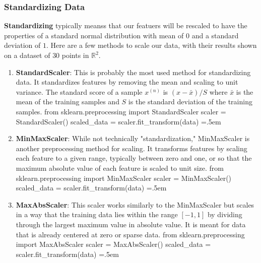 \documentclass{article}
\theoremstyle{definition}
\newenvironment{cverbatim}
    {\SaveVerbatim{cverb}}
    {\endSaveVerbatim
    \flushleft\fboxrule=0pt\fboxsep=.5em
    \colorbox{cverbbg}{%
      \makebox[\dimexpr\linewidth-2\fboxsep][l]{\BUseVerbatim{cverb}}%
    }
    \endflushleft
  }
\begin{document}
    \subsubsection{Standardizing Data}

    \textbf{Standardizing} typically meanss that our featuers will be rescaled to have the properties of a standard normal distribution with mean of $0$ and a standard deviation of $1$. Here are a few methods to scale our data, with their results shown on a dataset of $30$ points in $\mathbb{R}^2$. 
    \begin{enumerate}
        \item \textbf{StandardScaler}: This is probably the most used method for standardizing data. It standardizes features by removing the mean and scaling to unit variance. The standard score of a sample $x^{(n)}$ is $(x - \bar{x})/S$ where $\bar{x}$ is the mean of the training samples and $S$ is the standard deviation of the training samples. 
        \begin{cverbatim}
        from sklearn.preprocessing import StandardScaler
        scaler = StandardScaler()
        scaled_data = scaler.fit_transform(data)
        \end{cverbatim}

        \item \textbf{MinMaxScaler}: While not technically "standardization," MinMaxScaler is another preprocessing method for scaling. It transforms features by scaling each feature to a given range, typically between zero and one, or so that the maximum absolute value of each feature is scaled to unit size. 
        \begin{cverbatim}
        from sklearn.preprocessing import MinMaxScaler
        scaler = MinMaxScaler()
        scaled_data = scaler.fit_transform(data)
        \end{cverbatim}

        \item \textbf{MaxAbsScaler}: This scaler works similarly to the MinMaxScaler but scales in a way that the training data lies within the range $[-1, 1]$ by dividing through the largest maximum value in absolute value. It is meant for data that is already centered at zero or sparse data. 
        \begin{cverbatim}
        from sklearn.preprocessing import MaxAbsScaler
        scaler = MaxAbsScaler()
        scaled_data = scaler.fit_transform(data)
        \end{cverbatim}


\end{enumerate}
\end{document}
